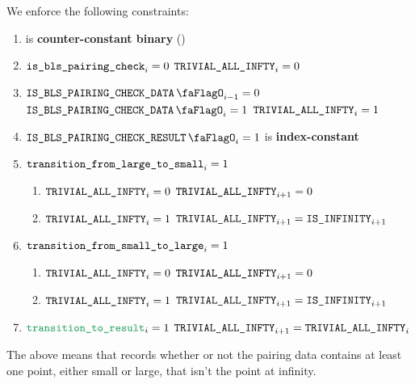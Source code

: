 We enforce the following constraints:
\begin{enumerate}
    \item \trivialAllInf{} is \textbf{counter-constant binary} \quad (\trash)
    \item \If $\texttt{is\_bls\_pairing\_check} _{i} = 0$ \Then $\texttt{TRIVIAL\_ALL\_INFTY} _{i} = 0$
    \item \If $\isBlsPairingCheckData_{i - 1} = 0$ \et $\isBlsPairingCheckData _{i} = 1$ \Then $\texttt{TRIVIAL\_ALL\_INFTY}_{i} = 1$
    \item \If $\isBlsPairingCheckResult_{i} = 1$ \Then \trivialAllInf{} is \textbf{index-constant}
    \item \If $\texttt{transition\_from\_large\_to\_small}_{i} = 1$ \Then 
          \begin{enumerate}
              \item \If $\texttt{TRIVIAL\_ALL\_INFTY} _{i} = 0$ \Then $\texttt{TRIVIAL\_ALL\_INFTY} _{i + 1} = 0$
              \item \If $\texttt{TRIVIAL\_ALL\_INFTY} _{i} = 1$ \Then $\texttt{TRIVIAL\_ALL\_INFTY} _{i + 1} = \texttt{IS\_INFINITY}_{i + 1}$
          \end{enumerate}
    \item \If $\texttt{transition\_from\_small\_to\_large}_{i} = 1$ \Then
          \begin{enumerate}
              \item \If $\texttt{TRIVIAL\_ALL\_INFTY} _{i} = 0$ \Then $\texttt{TRIVIAL\_ALL\_INFTY} _{i + 1} = 0$
              \item \If $\texttt{TRIVIAL\_ALL\_INFTY} _{i} = 1$ \Then $\texttt{TRIVIAL\_ALL\_INFTY} _{i + 1} = \texttt{IS\_INFINITY}_{i + 1}$
          \end{enumerate}
    \item \If $\locTransitionToResult_{i} = 1$ \Then $\texttt{TRIVIAL\_ALL\_INFTY}_{i+1} = \texttt{TRIVIAL\_ALL\_INFTY}_{i}$
\end{enumerate}
\saNote{} The above means that \trivialAllInf{} records whether or not the pairing data contains at least one point, either small or large, that isn't the point at infinity.

